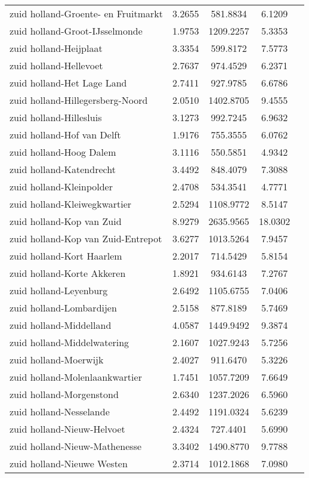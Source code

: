 \begin{longtable}{llccc}
zuid holland-Groente- en Fruitmarkt & 3.2655 & 581.8834 & 6.1209 \\
zuid holland-Groot-IJsselmonde & 1.9753 & 1209.2257 & 5.3353 \\
zuid holland-Heijplaat & 3.3354 & 599.8172 & 7.5773 \\
zuid holland-Hellevoet & 2.7637 & 974.4529 & 6.2371 \\
zuid holland-Het Lage Land & 2.7411 & 927.9785 & 6.6786 \\
zuid holland-Hillegersberg-Noord & 2.0510 & 1402.8705 & 9.4555 \\
zuid holland-Hillesluis & 3.1273 & 992.7245 & 6.9632 \\
zuid holland-Hof van Delft & 1.9176 & 755.3555 & 6.0762 \\
zuid holland-Hoog Dalem & 3.1116 & 550.5851 & 4.9342 \\
zuid holland-Katendrecht & 3.4492 & 848.4079 & 7.3088 \\
zuid holland-Kleinpolder & 2.4708 & 534.3541 & 4.7771 \\
zuid holland-Kleiwegkwartier & 2.5294 & 1108.9772 & 8.5147 \\
zuid holland-Kop van Zuid & 8.9279 & 2635.9565 & 18.0302 \\
zuid holland-Kop van Zuid-Entrepot & 3.6277 & 1013.5264 & 7.9457 \\
zuid holland-Kort Haarlem & 2.2017 & 714.5429 & 5.8154 \\
zuid holland-Korte Akkeren & 1.8921 & 934.6143 & 7.2767 \\
zuid holland-Leyenburg & 2.6492 & 1105.6755 & 7.0406 \\
zuid holland-Lombardijen & 2.5158 & 877.8189 & 5.7469 \\
zuid holland-Middelland & 4.0587 & 1449.9492 & 9.3874 \\
zuid holland-Middelwatering & 2.1607 & 1027.9243 & 5.7256 \\
zuid holland-Moerwijk & 2.4027 & 911.6470 & 5.3226 \\
zuid holland-Molenlaankwartier & 1.7451 & 1057.7209 & 7.6649 \\
zuid holland-Morgenstond & 2.6340 & 1237.2026 & 6.5960 \\
zuid holland-Nesselande & 2.4492 & 1191.0324 & 5.6239 \\
zuid holland-Nieuw-Helvoet & 2.4324 & 727.4401 & 5.6990 \\
zuid holland-Nieuw-Mathenesse & 3.3402 & 1490.8770 & 9.7788 \\
zuid holland-Nieuwe Westen & 2.3714 & 1012.1868 & 7.0980 \\

\end{longtable}
